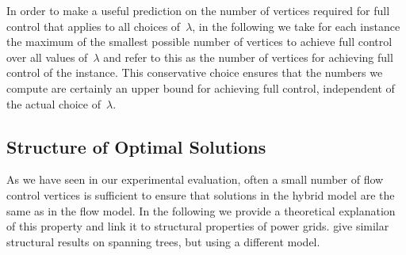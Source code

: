 In order to make a useful prediction on the number of vertices required for full
control that applies to all choices of~$\lambda$, in the following we take for
each instance the maximum of the smallest possible number of vertices to achieve
full control over all values of~$\lambda$ and refer to this as the number of
vertices for achieving full control of the instance.  This conservative choice
ensures that the numbers we compute are certainly an upper bound for achieving
full control, independent of the actual choice of~$\lambda$.
%
\subsection{Structure of Optimal Solutions}
\label{ch:facts:sub:hybridtheory}
%
As we have seen in our experimental evaluation, often a small number of flow
control vertices is sufficient to ensure that solutions in the hybrid model are
the same as in the flow model.  In the following we provide a theoretical
explanation of this property and link it to structural properties of power
grids. \textcite{6507352} give similar structural results on spanning trees, but
using a different model.

